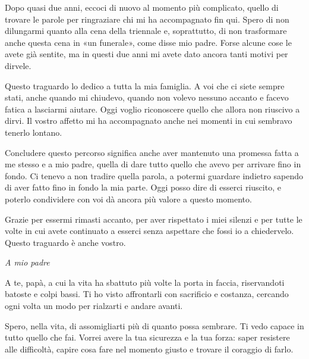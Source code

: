 \providecommand{\dascrivere}[1]{{\color{gray}\small[da scrivere: #1]}}

\noindent
Dopo quasi due anni, eccoci di nuovo al momento più complicato, quello di trovare le parole per ringraziare chi mi ha accompagnato fin qui. Spero di non dilungarmi quanto alla cena della triennale e, soprattutto, di non trasformare anche questa cena in «un funerale», come disse mio padre. Forse alcune cose le avete già sentite, ma in questi due anni mi avete dato ancora tanti motivi per dirvele.\par

\vspace{5mm}
Questo traguardo lo dedico a tutta la mia famiglia. A voi che ci siete sempre stati, anche quando mi chiudevo, quando non volevo nessuno accanto e facevo fatica a lasciarmi aiutare. Oggi voglio riconoscere quello che allora non riuscivo a dirvi. Il vostro affetto mi ha accompagnato anche nei momenti in cui sembravo tenerlo lontano.\par

Concludere questo percorso significa anche aver mantenuto una promessa fatta a me stesso e a mio padre, quella di dare tutto quello che avevo per arrivare fino in fondo. Ci tenevo a non tradire quella parola, a potermi guardare indietro sapendo di aver fatto fino in fondo la mia parte. Oggi posso dire di esserci riuscito, e poterlo condividere con voi dà ancora più valore a questo momento.\par

Grazie per essermi rimasti accanto, per aver rispettato i miei silenzi e per tutte le volte in cui avete continuato a esserci senza aspettare che fossi io a chiedervelo. Questo traguardo è anche vostro.\par

\vspace{5mm}
\textit{A mio padre}\par
\vspace{2mm}
A te, papà, a cui la vita ha sbattuto più volte la porta in faccia, riservandoti batoste e colpi bassi. Ti ho visto affrontarli con sacrificio e costanza, cercando ogni volta un modo per rialzarti e andare avanti.\par

Spero, nella vita, di assomigliarti più di quanto possa sembrare. Ti vedo capace in tutto quello che fai. Vorrei avere la tua sicurezza e la tua forza: saper resistere alle difficoltà, capire cosa fare nel momento giusto e trovare il coraggio di farlo.\par

